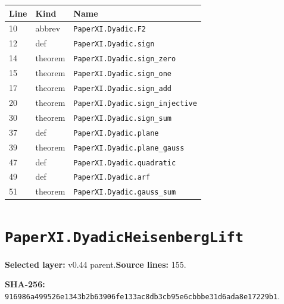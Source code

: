\documentclass[10pt,oneside]{book}
\begin{document}
\begin{longtable}{@{}p{}p{}p{}@{}}\toprule Line&Kind&Name\\\midrule\endhead

10&abbrev&\nolinkurl{PaperXI.Dyadic.F2}\\

12&def&\nolinkurl{PaperXI.Dyadic.sign}\\

14&theorem&\nolinkurl{PaperXI.Dyadic.sign_zero}\\

15&theorem&\nolinkurl{PaperXI.Dyadic.sign_one}\\

17&theorem&\nolinkurl{PaperXI.Dyadic.sign_add}\\

20&theorem&\nolinkurl{PaperXI.Dyadic.sign_injective}\\

30&theorem&\nolinkurl{PaperXI.Dyadic.sign_sum}\\

37&def&\nolinkurl{PaperXI.Dyadic.plane}\\

39&theorem&\nolinkurl{PaperXI.Dyadic.plane_gauss}\\

47&def&\nolinkurl{PaperXI.Dyadic.quadratic}\\

49&def&\nolinkurl{PaperXI.Dyadic.arf}\\

51&theorem&\nolinkurl{PaperXI.Dyadic.gauss_sum}\\

\bottomrule\end{longtable}

\section{\texorpdfstring{\nolinkurl{PaperXI.DyadicHeisenbergLift}}{PaperXI.DyadicHeisenbergLift}}\label{module:PaperXI.DyadicHeisenbergLift}

\textbf{Selected layer:} v0.44 parent.\quad\textbf{Source lines:} 155.\par\textbf{SHA-256:} {\scriptsize\nolinkurl{916986a499526e1343b2b63906fe133ac8db3cb95e6cbbbe31d6ada8e17229b1}}.

\end{document}
